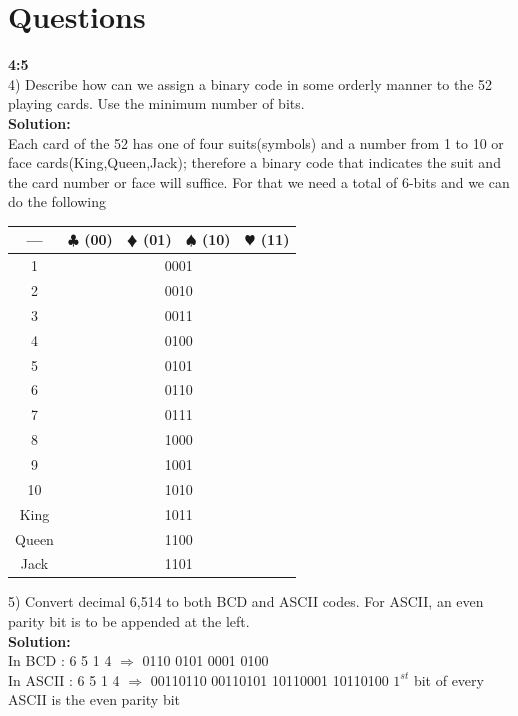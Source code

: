 \documentclass[a4paper,12pt]{extarticle}
\begin{document}
\section*{\LARGE Questions }{\textbf{\LARGE 4:5}}\\[0.5cm]
4) Describe how can we assign a binary code in some orderly manner to the 52 playing cards. Use the minimum number of bits.\\[0.4cm]
{\color{blue}\textbf{Solution:}}\\[0.3cm]
\indent Each card of the 52 has one of four suits(symbols) and a number from 1 to 10 or face cards(King,Queen,Jack); therefore a binary code that indicates the suit and the card number or face will suffice. For that we need a total of 6-bits and we can do the following
\begin{center}
\begin{tabular}{|c|c|c|c|c|}
\hline 
--- & $\clubsuit$ (00) & $\vardiamondsuit$ (01) & $\spadesuit$ (10) & $\varheartsuit$ (11) \\ 
\hline 
 1& \multicolumn{4}{c|}{0001} \\ 
\hline 
2 & \multicolumn{4}{c|}{0010} \\ 
\hline 
3 & \multicolumn{4}{c|}{0011} \\ 
\hline 
4 & \multicolumn{4}{c|}{0100} \\ 
\hline 
5 & \multicolumn{4}{c|}{0101} \\ 
\hline 
6 & \multicolumn{4}{c|}{0110} \\ 
\hline 
7 & \multicolumn{4}{c|}{0111} \\ 
\hline 
8 & \multicolumn{4}{c|}{1000} \\ 
\hline 
9 & \multicolumn{4}{c|}{1001} \\ 
\hline 
10 & \multicolumn{4}{c|}{1010} \\ 
\hline 
King & \multicolumn{4}{c|}{1011} \\ 
\hline 
Queen & \multicolumn{4}{c|}{1100} \\ 
\hline 
Jack & \multicolumn{4}{c|}{1101} \\ 
\hline 
\end{tabular}
\end{center}
5) Convert decimal 6,514 to both BCD and ASCII codes. For ASCII, an even parity bit is to be
appended at the left.\\[0.3cm]
{\color{blue}\textbf{Solution:}}\\[0.3cm]
\indent \color{black} In BCD :  \color{black} \color{cyan} 6 \color{orange} 5 \color{violet} 1 \color{blue} 4 \color{black} $\Rightarrow$  \color{cyan} 0110 \color{orange} 0101 \color{violet} 0001 \color{blue} 0100 \\[0.2cm]
\indent \color{black} In ASCII :  \color{black} \color{cyan} 6 \color{orange} 5 \color{violet} 1 \color{blue} 4 \color{black} $\Rightarrow$  \color{cyan} 00110110 \color{orange} 00110101 \color{violet} 10110001 \color{blue} 10110100 \color{black} $1^{st}$ bit of every ASCII is the even parity bit
\newpage
\color{black}
\end{document}
